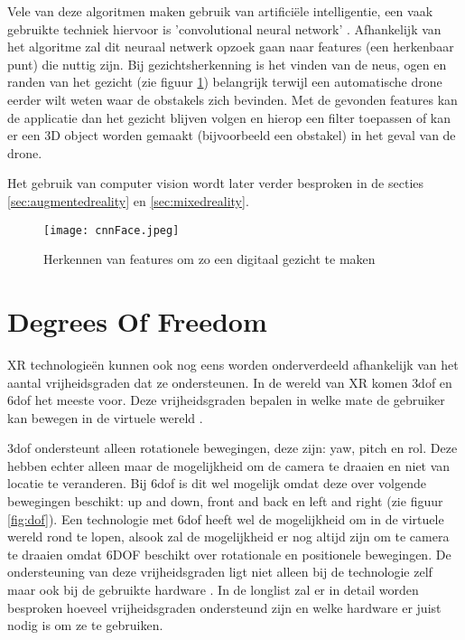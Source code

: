 Vele van deze algoritmen maken gebruik van artificiële intelligentie, een vaak gebruikte techniek hiervoor is 'convolutional neural network' \autocite{Ji2013}. Afhankelijk van het algoritme zal dit neuraal netwerk opzoek gaan naar features (een herkenbaar punt) die nuttig zijn. Bij gezichtsherkenning is het vinden van de neus, ogen en randen van het gezicht (zie figuur \ref{fig:cnnface}) belangrijk terwijl een automatische drone eerder wilt weten waar de obstakels zich bevinden. Met de gevonden features kan de applicatie dan het gezicht blijven volgen en hierop een filter toepassen of kan er een 3D object worden gemaakt (bijvoorbeeld een obstakel) in het geval van de drone. 

Het gebruik van computer vision wordt later verder besproken in de secties \ref{sec:augmentedreality} en \ref{sec:mixedreality}.

\begin{figure}
    \texttt{[image: cnnFace.jpeg]}
    \caption{Herkennen van features om zo een digitaal gezicht te maken \autocite{Murray2017}}
    \label{fig:cnnface}
\end{figure}

\section{Degrees Of Freedom}

XR technologieën kunnen ook nog eens worden onderverdeeld afhankelijk van het aantal vrijheidsgraden dat ze ondersteunen. In de wereld van XR komen \acrshort{3dof} en \acrshort{6dof} het meeste voor. Deze vrijheidsgraden bepalen in welke mate de gebruiker kan bewegen in de virtuele wereld \autocite{Chen1995}.

\acrshort{3dof} ondersteunt alleen rotationele bewegingen, deze zijn: yaw, pitch en rol. Deze hebben echter alleen maar de mogelijkheid om de camera te draaien en niet van locatie te veranderen. Bij \acrshort{6dof} is dit wel mogelijk omdat deze over volgende bewegingen beschikt: up and down, front and back en left and right (zie figuur \ref{fig:dof}).
Een technologie met \acrshort{6dof} heeft wel de mogelijkheid om in de virtuele wereld rond te lopen, alsook zal de mogelijkheid er nog altijd zijn om te camera te draaien omdat 6DOF beschikt over rotationale en positionele bewegingen. De ondersteuning van deze vrijheidsgraden ligt niet alleen bij de technologie zelf maar ook bij de gebruikte hardware \autocite{Chen1995}. In de longlist zal er in detail worden besproken hoeveel vrijheidsgraden ondersteund zijn en welke hardware er juist nodig is om ze te gebruiken.


